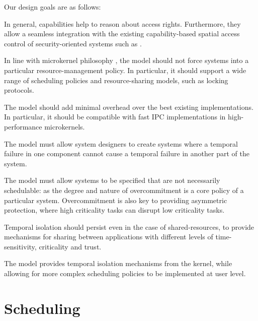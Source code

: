 Our design goals are as follows:
\begin{description}\sloppy
    \item[Capability-controlled enforcement of time limits:] In general, capabilities
      help to reason about access rights. Furthermore, they allow a
        seamless integration with the existing capability-based spatial
          access control of security-oriented systems such as \selfour.
    \item[Policy freedom:] In line with microkernel philosophy
        \citep{Heiser_Elphinstone_16}, the model should not force systems
        into a particular resource-management policy. In particular, it
        should support a wide range of scheduling policies and
        resource-sharing models, such as locking protocols.
    \item[Efficient:] The model should add minimal overhead over the best
                      existing implementations. In particular, it should be compatible
                        with fast IPC implementations in high-performance microkernels.

    \item[Temporal isolation:] The model must allow system designers to create systems where a
        temporal failure in one component cannot cause a temporal failure in another part of the
        system.

    \item[Overcommitment:] The model must allow systems to be specified that are not necessarily
        schedulable: as the degree and nature of overcommitment is a core policy of a particular
        system. Overcommitment is also key to providing  asymmetric protection, where high
        criticality tasks can disrupt low criticality tasks.

    \item[Safe resource sharing:] Temporal isolation should persist even in the case of
        shared-resources, to provide mechanisms for sharing between applications with different
        levels of time-sensitivity, criticality and trust.
\end{description}

The model  provides temporal isolation mechanisms from the kernel, while allowing for more complex
scheduling policies to be implemented at user level.

\section{Scheduling}

